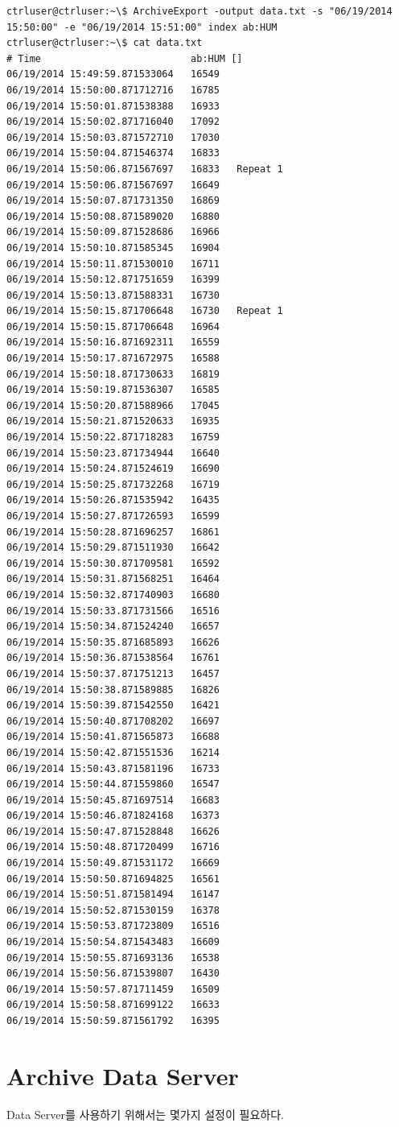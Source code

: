\documentclass[11pt
  , a4paper
  , article
  , oneside
]{memoir}
\begin{document}
\begin{lstlisting}[style=termstyle]
ctrluser@ctrluser:~\$ ArchiveExport -output data.txt -s "06/19/2014 15:50:00" -e "06/19/2014 15:51:00" index ab:HUM
ctrluser@ctrluser:~\$ cat data.txt
# Time                       	ab:HUM []	
06/19/2014 15:49:59.871533064	16549	
06/19/2014 15:50:00.871712716	16785	
06/19/2014 15:50:01.871538388	16933	
06/19/2014 15:50:02.871716040	17092	
06/19/2014 15:50:03.871572710	17030	
06/19/2014 15:50:04.871546374	16833	
06/19/2014 15:50:06.871567697	16833	Repeat 1
06/19/2014 15:50:06.871567697	16649	
06/19/2014 15:50:07.871731350	16869	
06/19/2014 15:50:08.871589020	16880	
06/19/2014 15:50:09.871528686	16966	
06/19/2014 15:50:10.871585345	16904	
06/19/2014 15:50:11.871530010	16711	
06/19/2014 15:50:12.871751659	16399	
06/19/2014 15:50:13.871588331	16730	
06/19/2014 15:50:15.871706648	16730	Repeat 1
06/19/2014 15:50:15.871706648	16964	
06/19/2014 15:50:16.871692311	16559	
06/19/2014 15:50:17.871672975	16588	
06/19/2014 15:50:18.871730633	16819	
06/19/2014 15:50:19.871536307	16585	
06/19/2014 15:50:20.871588966	17045	
06/19/2014 15:50:21.871520633	16935	
06/19/2014 15:50:22.871718283	16759	
06/19/2014 15:50:23.871734944	16640	
06/19/2014 15:50:24.871524619	16690	
06/19/2014 15:50:25.871732268	16719	
06/19/2014 15:50:26.871535942	16435	
06/19/2014 15:50:27.871726593	16599	
06/19/2014 15:50:28.871696257	16861	
06/19/2014 15:50:29.871511930	16642	
06/19/2014 15:50:30.871709581	16592	
06/19/2014 15:50:31.871568251	16464	
06/19/2014 15:50:32.871740903	16680	
06/19/2014 15:50:33.871731566	16516	
06/19/2014 15:50:34.871524240	16657	
06/19/2014 15:50:35.871685893	16626	
06/19/2014 15:50:36.871538564	16761	
06/19/2014 15:50:37.871751213	16457	
06/19/2014 15:50:38.871589885	16826	
06/19/2014 15:50:39.871542550	16421	
06/19/2014 15:50:40.871708202	16697	
06/19/2014 15:50:41.871565873	16688	
06/19/2014 15:50:42.871551536	16214	
06/19/2014 15:50:43.871581196	16733	
06/19/2014 15:50:44.871559860	16547	
06/19/2014 15:50:45.871697514	16683	
06/19/2014 15:50:46.871824168	16373	
06/19/2014 15:50:47.871528848	16626	
06/19/2014 15:50:48.871720499	16716	
06/19/2014 15:50:49.871531172	16669	
06/19/2014 15:50:50.871694825	16561	
06/19/2014 15:50:51.871581494	16147	
06/19/2014 15:50:52.871530159	16378	
06/19/2014 15:50:53.871723809	16516	
06/19/2014 15:50:54.871543483	16609	
06/19/2014 15:50:55.871693136	16538	
06/19/2014 15:50:56.871539807	16430	
06/19/2014 15:50:57.871711459	16509	
06/19/2014 15:50:58.871699122	16633	
06/19/2014 15:50:59.871561792	16395	
\end{lstlisting}
\section{Archive Data Server}
Data Server를 사용하기 위해서는 몇가지 설정이 필요하다.
\end{document}
